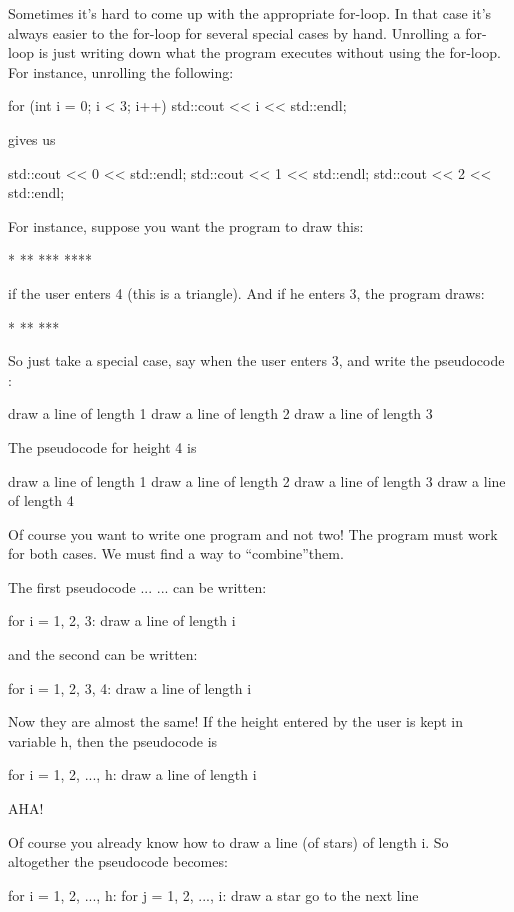 Sometimes it's hard to come up with the appropriate for-loop. In that case it's always easier to  the for-loop for several special cases by hand. Unrolling a for-loop is just writing down what the program executes without using the for-loop. For instance, unrolling the following:
\begin{console}
for (int i = 0; i < 3; i++)
{   
    std::cout << i << std::endl;
}

gives us
\begin{console}
std::cout << 0 << std::endl;
std::cout << 1 << std::endl;
std::cout << 2 << std::endl;
\end{console}
For instance, suppose you want the program to draw this:
\begin{console}
*
**
***
****
\end{console}
if the user enters 4 (this is a triangle). And if he enters 3, the
program draws:
\begin{console}
*
**
***
\end{console}
So just take a special case, say when the user enters 3, and write the
pseudocode :
\begin{console}
draw a line of length 1
draw a line of length 2
draw a line of length 3
\end{console}
The pseudocode for height 4 is
\begin{console}
draw a line of length 1
draw a line of length 2
draw a line of length 3
draw a line of length 4
\end{console}
Of course you want to write one program and not two! The program must
work for both cases. We must find a way to ``combine''them.

The first pseudocode ...  ... can be written:
\begin{console}
for i = 1, 2, 3:
           draw a line of length i
\end{console}
and the second can be written:
\begin{console}
for i = 1, 2, 3, 4:
           draw a line of length i
\end{console}

Now they are almost the same! If the height entered by the user is kept
in variable h, then the pseudocode is
\begin{console}
for i = 1, 2, ..., h:
           draw a line of length i
\end{console}
AHA! 

Of course you already know how to draw a line (of stars) of length i. So
altogether the pseudocode becomes:
\begin{console}
for i = 1, 2, ..., h:
         for j = 1, 2, ..., i:
                 draw a star
         go to the next line
\end{console}


\end{console}
